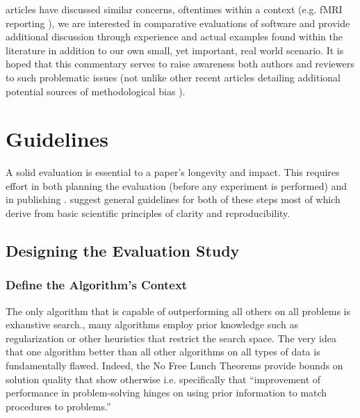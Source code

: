 \documentclass[final,5p,times,twocolumn]{elsarticle}
\begin{document}
  articles have discussed similar concerns, oftentimes
within a   context (e.g. fMRI reporting \cite{poldrack2008}), 
we are  interested in comparative evaluations of software
and provide additional discussion through experience and actual 
examples found within the literature in addition to our own small,
yet important, real world scenario.
It is hoped that this commentary serves to raise awareness  both 
authors and reviewers to such problematic issues (not unlike other
recent articles detailing additional potential sources of methodological 
bias \cite{kriegeskorte2009,vul2012,tustison2012}).


\section{Guidelines}
A solid evaluation is essential to a paper's longevity and
impact.  This requires effort in both planning the evaluation (before any
experiment is performed) and in publishing .
 suggest general guidelines for both of these steps most of which
derive from basic scientific principles of clarity and reproducibility.

\subsection{Designing the Evaluation Study}


\subsubsection{Define the Algorithm's Context}
The only algorithm that is capable of outperforming all others on all
problems is exhaustive search., many algorithms employ
prior knowledge such as regularization or other heuristics that
restrict the search space.  The very idea that one algorithm  better than all other algorithms on
all types of data is fundamentally flawed.  Indeed, the No Free Lunch
Theorems  provide bounds on solution quality that show otherwise
i.e. specifically that ``improvement of performance in problem-solving hinges on using prior information to match procedures to problems.''
\end{document}
